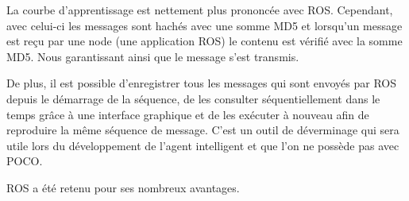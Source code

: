 La courbe d’apprentissage est nettement plus prononcée avec ROS. Cependant, avec celui-ci les messages sont hachés avec une somme MD5 et lorsqu’un message est reçu par une node (une application ROS) le contenu est vérifié avec la somme MD5. Nous garantissant ainsi que le message s’est transmis.

De plus, il est possible d’enregistrer tous les messages qui sont envoyés par ROS depuis le démarrage de la séquence, de les consulter séquentiellement dans le temps grâce à une interface graphique et de les exécuter à nouveau afin de reproduire la même séquence de message. C’est un outil de déverminage qui sera utile lors du développement de l’agent intelligent et que l’on ne possède pas avec POCO.

ROS a été retenu pour ses nombreux avantages. 
